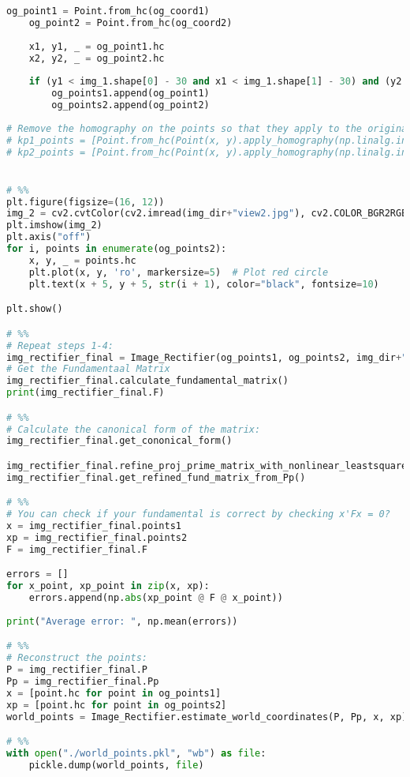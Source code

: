 \documentclass{article}
\begin{document}
\begin{lstlisting}[language=Python]
    og_point1 = Point.from_hc(og_coord1)
    og_point2 = Point.from_hc(og_coord2)
    
    x1, y1, _ = og_point1.hc
    x2, y2, _ = og_point2.hc
    
    if (y1 < img_1.shape[0] - 30 and x1 < img_1.shape[1] - 30) and (y2 < img_2.shape[0] - 30 and x2 < img_2.shape[1] - 30):
        og_points1.append(og_point1)
        og_points2.append(og_point2)
        
# Remove the homography on the points so that they apply to the original images:
# kp1_points = [Point.from_hc(Point(x, y).apply_homography(np.linalg.inv(H))) for (x, y) in kp1_coords]
# kp2_points = [Point.from_hc(Point(x, y).apply_homography(np.linalg.inv(Hp))) for (x, y) in kp2_coords]


# %%
plt.figure(figsize=(16, 12))
img_2 = cv2.cvtColor(cv2.imread(img_dir+"view2.jpg"), cv2.COLOR_BGR2RGB)
plt.imshow(img_2)
plt.axis("off")
for i, points in enumerate(og_points2):
    x, y, _ = points.hc
    plt.plot(x, y, 'ro', markersize=5)  # Plot red circle
    plt.text(x + 5, y + 5, str(i + 1), color="black", fontsize=10)

plt.show()

# %%
# Repeat steps 1-4:
img_rectifier_final = Image_Rectifier(og_points1, og_points2, img_dir+"view1.jpg", img_dir+"view2.jpg")#, warped_img1, warped_img2)
# Get the Fundamentaal Matrix
img_rectifier_final.calculate_fundamental_matrix()
print(img_rectifier_final.F)

# %%
# Calculate the canonical form of the matrix:
img_rectifier_final.get_cononical_form()

img_rectifier_final.refine_proj_prime_matrix_with_nonlinear_leastsquares()
img_rectifier_final.get_refined_fund_matrix_from_Pp()

# %%
# You can check if your fundamental is correct by checking x'Fx = 0?
x = img_rectifier_final.points1
xp = img_rectifier_final.points2
F = img_rectifier_final.F

errors = []
for x_point, xp_point in zip(x, xp):
    errors.append(np.abs(xp_point @ F @ x_point))
    
print("Average error: ", np.mean(errors))

# %%
# Reconstruct the points:
P = img_rectifier_final.P
Pp = img_rectifier_final.Pp
x = [point.hc for point in og_points1]
xp = [point.hc for point in og_points2]
world_points = Image_Rectifier.estimate_world_coordinates(P, Pp, x, xp)

# %%
with open("./world_points.pkl", "wb") as file:
    pickle.dump(world_points, file)


\end{lstlisting}
\end{document}
